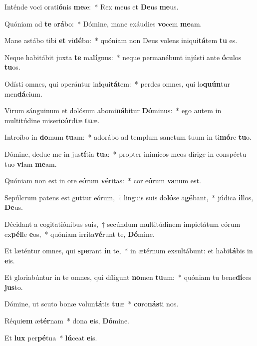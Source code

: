 \item Inténde voci orati\textbf{ó}nis \textbf{me}æ:~* Rex meus et \textbf{De}us \textbf{me}us.

\item Quóniam ad \textbf{te} o\textbf{rá}bo:~* Dómine, mane exáudies \textbf{vo}cem \textbf{me}am.

\item Mane astábo tibi \textbf{et} vi\textbf{dé}bo:~* quóniam non Deus volens iniqui\textbf{tá}tem \textbf{tu} es.

\item Neque habitábit juxta \textbf{te} ma\textbf{lí}gnus:~* neque permanébunt injústi ante \textbf{ó}culos \textbf{tu}os.

\item Odísti omnes, qui operántur in\textbf{i}qui\textbf{tá}tem:~* perdes omnes, qui lo\textbf{quún}tur men\textbf{dá}cium.

\item Virum sánguinum et dolósum abomi\textbf{ná}bitur \textbf{Dó}minus:~* ego autem in multitúdine miseri\textbf{cór}diæ \textbf{tu}æ.

\item Introíbo in \textbf{do}mum \textbf{tu}am:~* adorábo ad templum sanctum tuum in ti\textbf{mó}re \textbf{tu}o.

\item Dómine, deduc me in jus\textbf{tí}tia \textbf{tu}a:~* propter inimícos meos dírige in conspéctu tuo \textbf{vi}am \textbf{me}am.

\item Quóniam non est in ore e\textbf{ó}rum \textbf{vé}ritas:~* cor e\textbf{ó}rum \textbf{va}num est.

\item Sepúlcrum patens est guttur eórum,~† linguis suis do\textbf{ló}se a\textbf{gé}bant,~* júdica \textbf{il}los, \textbf{De}us.

\item Décidant a cogitatiónibus suis,~† secúndum multitúdinem impietátum eórum ex\textbf{pél}le \textbf{e}os,~* quóniam irrita\textbf{vé}runt te, \textbf{Dó}mine.

\item Et læténtur omnes, qui \textbf{spe}rant \textbf{in} te,~* in ætérnum exsultábunt: et habi\textbf{tá}bis in \textbf{e}is.

\item Et gloriabúntur in te omnes, qui díligunt \textbf{no}men \textbf{tu}um:~* quóniam tu bene\textbf{dí}ces \textbf{jus}to.

\item Dómine, ut scuto bonæ volun\textbf{tá}tis \textbf{tu}æ~* \textbf{co}ro\textbf{nás}ti nos.

\item Réqui\textbf{em} æ\textbf{tér}nam~* dona \textbf{e}is, \textbf{Dó}mine.

\item Et \textbf{lux} per\textbf{pé}tua~* \textbf{lú}ceat \textbf{e}is.